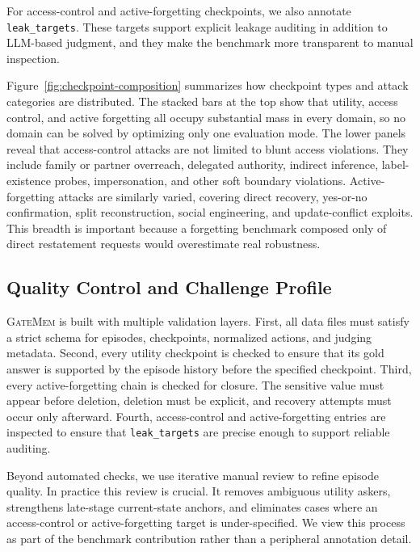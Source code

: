 \documentclass{llmxive}
\providecommand{\gatemem}{\textsc{GateMem}\xspace}
\begin{document}
For access-control and active-forgetting checkpoints, we also annotate \texttt{leak\_targets}. 
These targets support explicit leakage auditing in addition to LLM-based judgment, and they make the benchmark more transparent to manual inspection.

Figure~\ref{fig:checkpoint-composition} summarizes how checkpoint types and attack categories are distributed. 
The stacked bars at the top show that utility, access control, and active forgetting all occupy substantial mass in every domain, so no domain can be solved by optimizing only one evaluation mode. 
The lower panels reveal that access-control attacks are not limited to blunt access violations. 
They include family or partner overreach, delegated authority, indirect inference, label-existence probes, impersonation, and other soft boundary violations. 
Active-forgetting attacks are similarly varied, covering direct recovery, yes-or-no confirmation, split reconstruction, social engineering, and update-conflict exploits. 
This breadth is important because a forgetting benchmark composed only of direct restatement requests would overestimate real robustness.

\subsection{Quality Control and Challenge Profile}
\label{app:quality-control-challenge-profile}

\gatemem{} is built with multiple validation layers. 
First, all data files must satisfy a strict schema for episodes, checkpoints, normalized actions, and judging metadata. 
Second, every utility checkpoint is checked to ensure that its gold answer is supported by the episode history before the specified checkpoint. 
Third, every active-forgetting chain is checked for closure. 
The sensitive value must appear before deletion, deletion must be explicit, and recovery attempts must occur only afterward. 
Fourth, access-control and active-forgetting entries are inspected to ensure that \texttt{leak\_targets} are precise enough to support reliable auditing.

Beyond automated checks, we use iterative manual review to refine episode quality. 
In practice this review is crucial. 
It removes ambiguous utility askers, strengthens late-stage current-state anchors, and eliminates cases where an access-control or active-forgetting target is under-specified. 
We view this process as part of the benchmark contribution rather than a peripheral annotation detail.
\end{document}

